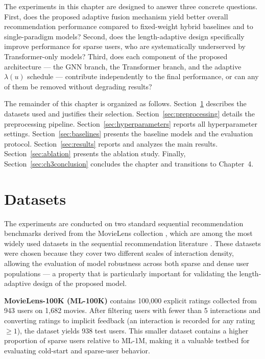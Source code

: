 \documentclass[12pt,a4paper]{report}
\begin{document}
The experiments in this chapter are designed to answer three concrete
questions. First, does the proposed adaptive fusion mechanism yield better
overall recommendation performance compared to fixed-weight hybrid baselines
and to single-paradigm models? Second, does the length-adaptive design
specifically improve performance for sparse users, who are systematically
underserved by Transformer-only models? Third, does each component of the
proposed architecture --- the GNN branch, the Transformer branch, and the
adaptive \(\lambda(u)\) schedule --- contribute independently to the final
performance, or can any of them be removed without degrading results?

The remainder of this chapter is organized as follows.
Section~\ref{sec:datasets} describes the datasets used and justifies their
selection. Section~\ref{sec:preprocessing} details the preprocessing pipeline.
Section~\ref{sec:hyperparameters} reports all hyperparameter settings.
Section~\ref{sec:baselines} presents the baseline models and the evaluation
protocol. Section~\ref{sec:results} reports and analyzes the main results.
Section~\ref{sec:ablation} presents the ablation study. Finally,
Section~\ref{sec:ch3conclusion} concludes the chapter and transitions to
Chapter~4.

\section{Datasets}
\label{sec:datasets}

The experiments are conducted on two standard sequential recommendation
benchmarks derived from the MovieLens collection \citep{harper2015movielens},
which are among the most widely used datasets in the sequential recommendation
literature \citep{pan2024survey, kang2018sasrec, sun2019bert4rec}. These
datasets were chosen because they cover two different scales of interaction
density, allowing the evaluation of model robustness across both sparse and
dense user populations --- a property that is particularly important for
validating the length-adaptive design of the proposed model.

\textbf{MovieLens-100K (ML-100K)} contains 100,000 explicit ratings collected
from 943 users on 1,682 movies. After filtering users with fewer than 5
interactions and converting ratings to implicit feedback (an interaction is
recorded for any rating \(\geq 1\)), the dataset yields 938 test users. This
smaller dataset contains a higher proportion of sparse users relative to
ML-1M, making it a valuable testbed for evaluating cold-start and sparse-user
behavior.
\end{document}
